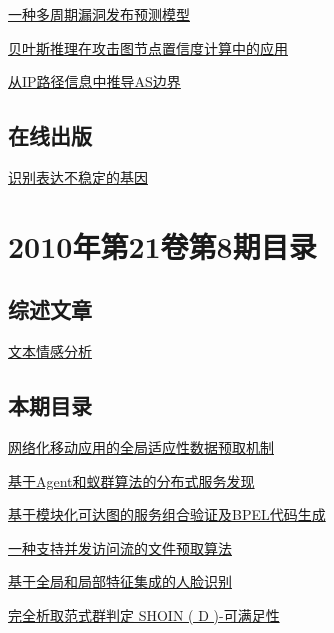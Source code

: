\documentclass[a4paper]{article}
\begin{document}
\href{http://www.jos.org.cn/ch/reader/download_pdf.aspx?file_no=3626&year_id=2010&quarter_id=9&falg=1}{一种多周期漏洞发布预测模型}

\href{http://www.jos.org.cn/ch/reader/download_pdf.aspx?file_no=3632&year_id=2010&quarter_id=9&falg=1}{贝叶斯推理在攻击图节点置信度计算中的应用}

\href{http://www.jos.org.cn/ch/reader/download_pdf.aspx?file_no=3741&year_id=2010&quarter_id=9&falg=1}{从IP路径信息中推导AS边界}

\subsection{在线出版}
\href{http://www.jos.org.cn/ch/reader/download_pdf.aspx?file_no=3796&year_id=2010&quarter_id=9&falg=1}{识别表达不稳定的基因}


\section{\textbf{2010年第21卷第8期目录}}
\subsection{综述文章}
\href{http://www.jos.org.cn/ch/reader/download_pdf.aspx?file_no=3832&year_id=2010&quarter_id=8&falg=1}{文本情感分析}

\subsection{本期目录}
\href{http://www.jos.org.cn/ch/reader/download_pdf.aspx?file_no=3617&year_id=2010&quarter_id=8&falg=1}{网络化移动应用的全局适应性数据预取机制}

\href{http://www.jos.org.cn/ch/reader/download_pdf.aspx?file_no=3669&year_id=2010&quarter_id=8&falg=1}{基于Agent和蚁群算法的分布式服务发现}

\href{http://www.jos.org.cn/ch/reader/download_pdf.aspx?file_no=3618&year_id=2010&quarter_id=8&falg=1}{基于模块化可达图的服务组合验证及BPEL代码生成}

\href{http://www.jos.org.cn/ch/reader/download_pdf.aspx?file_no=3605&year_id=2010&quarter_id=8&falg=1}{一种支持并发访问流的文件预取算法}

\href{http://www.jos.org.cn/ch/reader/download_pdf.aspx?file_no=3627&year_id=2010&quarter_id=8&falg=1}{基于全局和局部特征集成的人脸识别}

\href{http://www.jos.org.cn/ch/reader/download_pdf.aspx?file_no=3597&year_id=2010&quarter_id=8&falg=1}{完全析取范式群判定 SHOIN ( D )-可满足性}
\end{document}
